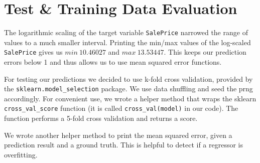 \section{Test \& Training Data Evaluation}

The logarithmic scaling of the target variable \texttt{SalePrice} narrowed the range of values to a much smaller interval. Printing the min/max values of the log-scaled \texttt{SalePrice} gives us $min~10.46027$ and $max~13.53447$. This keeps our prediction errors below 1 and thus allows us to use mean squared error functions.

For testing our predictions we decided to use k-fold cross validation, provided by the \texttt{sklearn.model\_selection} package. We use data shuffling and seed the prng accordingly. For convenient use, we wrote a helper method that wraps the sklearn \texttt{cross\_val\_score} function (it is called \texttt{cross\_val(model)} in our code). The function performs a 5-fold cross validation and returns a score.

We wrote another helper method to print the mean squared error, given a prediction result and a ground truth. This is helpful to detect if a regressor is overfitting.